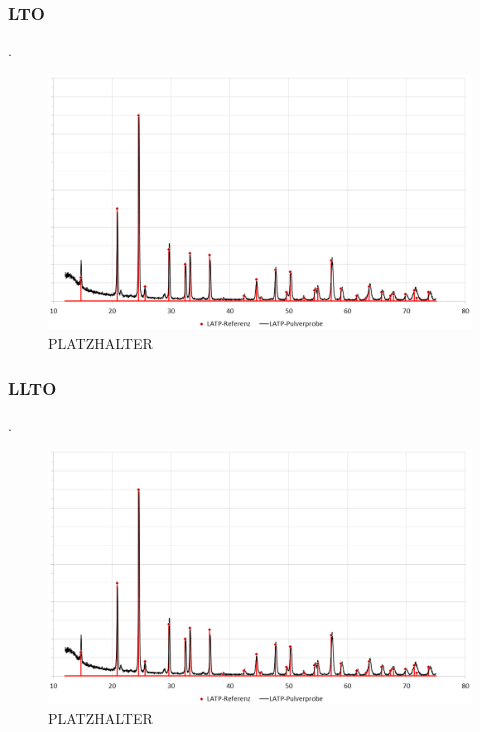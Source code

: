 \documentclass[a4paper, 11pt, headsepline,footsepline,twoside,abstract]{scrbook}
\begin{document}
\subsubsection{LTO}
.
\begin{figure}
	\centering
	\includegraphics[width=1.0\columnwidth]{images/XRD_LATP.png}
	\caption{PLATZHALTER}
	\label{xrd_LTO}
\end{figure}
\newpage
\subsubsection{LLTO}
.
\begin{figure}
	\centering
	\includegraphics[width=1.0\columnwidth]{images/XRD_LATP.png}
	\caption{PLATZHALTER}
	\label{xrd_LTO}
\end{figure}
\newpage
\end{document}
